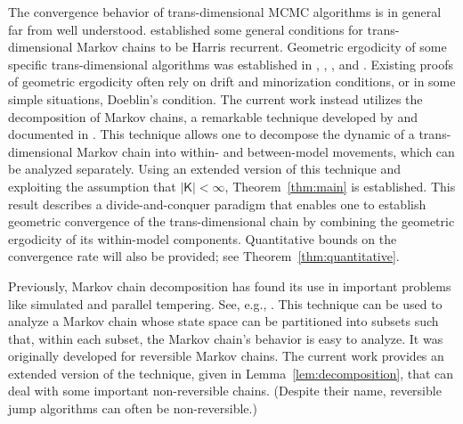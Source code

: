 \documentclass[12pt]{article}
\begin{document}


The convergence behavior of trans-dimensional MCMC algorithms is in general far from well understood.
\cite{roberts2006harris} established some general conditions for trans-dimensional Markov chains to be Harris recurrent.
Geometric ergodicity of some specific trans-dimensional algorithms was established in \cite{geyer1994simulation}, \cite{andrieu1999joint}, \cite{ortner2006reversible}, and \cite{schreck2015shrinkage}.
Existing proofs of geometric ergodicity often rely on drift and minorization conditions, or in some simple situations, Doeblin's condition.
The current work instead utilizes the decomposition of Markov chains, a remarkable technique developed by \cite{caracciolo1992two} and documented in \cite{madras2002markov}.
This technique allows one to decompose the dynamic of a trans-dimensional Markov chain into within- and between-model movements, which can be analyzed separately.
Using an extended version of this technique and exploiting the assumption that $|\mathsf{K}| < \infty$, Theorem~\ref{thm:main} is established.
This result describes a divide-and-conquer paradigm that enables one to establish geometric convergence of the trans-dimensional chain by combining the geometric ergodicity of its within-model components.
Quantitative bounds on the convergence rate will also be provided; see Theorem~\ref{thm:quantitative}.


Previously, Markov chain decomposition has found its use in important problems like simulated and parallel tempering.
See, e.g., \cite{madras2002markov, woodard2009conditions, ge2018simulated}.
This technique can be used to analyze a Markov chain whose state space can be partitioned into subsets such that, within each subset, the Markov chain's behavior is easy to analyze.
It was originally developed for reversible Markov chains.
The current work provides an extended version of the technique, given in Lemma~\ref{lem:decomposition}, that can deal with some important non-reversible chains.
(Despite their name, reversible jump algorithms can often be non-reversible.)
\end{document}
